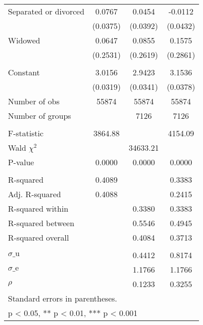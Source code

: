 {\begin{tabular}{l*{3}{c}}
Separated or divorced&      0.0767\sym{*}  &      0.0454         &     -0.0112         \\
                    &    (0.0375)         &    (0.0392)         &    (0.0432)         \\
Widowed             &      0.0647         &      0.0855         &      0.1575         \\
                    &    (0.2531)         &    (0.2619)         &    (0.2861)         \\
                    &                     &                     &                     \\
Constant            &      3.0156\sym{***}&      2.9423\sym{***}&      3.1536\sym{***}\\
                    &    (0.0319)         &    (0.0341)         &    (0.0378)         \\
\midrule
Number of obs       &       55874         &       55874         &       55874         \\
Number of groups    &                     &        7126         &        7126         \\
\\ F-statistic      &     3864.88         &                     &     4154.09         \\
Wald $\chi^2$       &                     &    34633.21         &                     \\
P-value             &      0.0000         &      0.0000         &      0.0000         \\
\\ R-squared        &      0.4089         &                     &      0.3383         \\
Adj. R-squared      &      0.4088         &                     &      0.2415         \\
R-squared within    &                     &      0.3380         &      0.3383         \\
R-squared between   &                     &      0.5546         &      0.4945         \\
R-squared overall   &                     &      0.4084         &      0.3713         \\
\\ $\sigma\text{\_u}$&                     &      0.4412         &      0.8174         \\
$\sigma\text{\_e}$   &                     &      1.1766         &      1.1766         \\
$\rho$              &                     &      0.1233         &      0.3255         \\
\bottomrule
\multicolumn{4}{l}{\footnotesize Standard errors in parentheses.}\\
\multicolumn{4}{l}{\footnotesize * p < 0.05, ** p < 0.01, *** p < 0.001}\\
\end{tabular}
}
